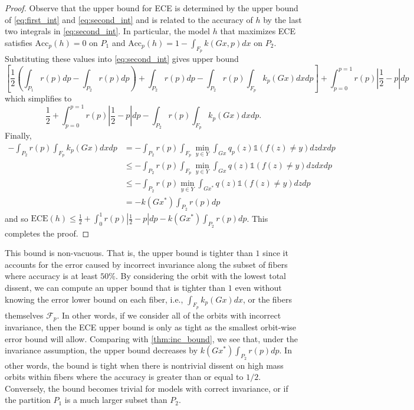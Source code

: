 \documentclass[10pt]{article} %
\theoremstyle{definition}
\newcommand{\ECE}{\mathrm{ECE}(h)}
\newcommand{\Acc}{\mathrm{Acc}_p(h)}
\begin{document}
\begin{proof}
Observe that the upper bound for ECE is determined by the upper bound of \cref{eq:first_int} and \cref{eq:second_int} and is related to the accuracy of $h$ by the last two integrals in  \cref{eq:second_int}. In particular, the model $h$ that maximizes ECE satisfies $\Acc = 0$ on $P_1$ and $\Acc = 1 - \int_{F_p}k(Gx,p) dx$ on $P_2$. Substituting these values into  \cref{eq:second_int} gives upper bound 
\[ 
\left[\frac{1}{2}\left(\int_{P_1}r(p)dp - \int_{P_2}r(p)dp\right) + \int_{P_2} r(p)dp - \int_{P_2}r(p)\int_{F_p}k_p(Gx) dxdp\right] + \int_{p=0}^{p=1}r(p)\left|\frac{1}{2} - p\right|dp
\] 
which simplifies to 
\[
\frac{1}{2}  + \int_{p=0}^{p=1}r(p)\left|\frac{1}{2} - p\right|dp -  \int_{P_2}r(p)\int_{F_p}k_p(Gx) dxdp.
\]
Finally, \begin{align*}
 -  \int_{P_2}r(p)\int_{F_p}k_p(Gx) dxdp &=  - \int_{P_2}r(p)\int_{F_p}\underset{y\in Y}{\min}\int_{Gx}q_p(z)\mathds{1}(f(z) \neq y) dzdxdp\\
&\leq  - \int_{P_2}r(p)\int_{F_p}\underset{y\in Y}{\min}\int_{Gx}q(z)\mathds{1}(f(z) \neq y) dzdxdp\\
&\leq  - \int_{P_2}r(p)\underset{y\in Y}{\min}\int_{Gx^*}q(z)\mathds{1}(f(z) \neq y) dzdp\\
&=  -  k(Gx^*)\int_{P_2}r(p) dp 
\end{align*}
and so $\ECE \leq \frac{1}{2} + \int_0^{1}r(p)|\frac{1}{2} - p|dp -  k(Gx^*)\int_{P_2}r(p) dp $. This completes the proof. 
\end{proof}

This bound is non-vacuous.  That is, the upper bound is tighter than $1$ since it accounts for the error caused by incorrect invariance along the subset of fibers where accuracy is at least $50\%$. By considering the orbit with the lowest total dissent, we can compute an upper bound that is tighter than $1$ even without knowing the error lower bound on each fiber, i.e., $\int_{F_p} k_p(Gx) dx$, or the fibers themselves $\mathcal{F}_p$. In other words, if we consider all of the orbits with incorrect invariance, then the ECE upper bound is only as tight as the smallest orbit-wise error bound will allow. Comparing with \cref{thm:inc_bound}, we see that, under the invariance assumption, the upper bound decreases by $k(Gx^*)\int_{P_2}r(p)dp$. In other words, the bound is tight when there is nontrivial dissent on high mass orbits within fibers where the accuracy is greater than or equal to $1/2$. Conversely, the bound becomes trivial for models with correct invariance, or if the partition $P_1$ is a much larger subset than $P_2$.
\end{document}
